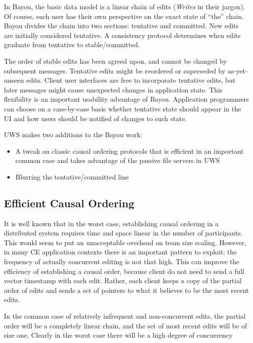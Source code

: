 \documentclass[runningheads]{llncs}
\begin{document}
In Bayou, the basic data model is a linear chain of edits (\emph{Writes} in their jargon).
Of course, each user has their own perspective on the exact state of ``the'' chain.
Bayou divides the chain into two sections: tentative and committed.
New edits are initially considered tentative.
A consistency protocol determines when edits graduate from tentative to stable{\slash}committed.

The order of stable edits has been agreed upon, and cannot be changed by subsequent messages.
Tentative edits might be reordered or superseded by as-yet-unseen edits.
Client user interfaces are free to incorporate tentative edits, but later messages might cause unexpected changes in application state.
This flexibility is an important usability advantage of Bayou.
Application programmers can choose on a case-by-case basis whether tentative state should appear in the UI and how users should be notified of changes to such state.

UWS makes two additions to the Bayou work:

\begin{itemize}
\item A tweak on classic causal ordering protocols that is efficient in an important common case and takes advantage of the passive file servers in UWS
\item Blurring the tentative{\slash}committed line
\end{itemize}

\subsection{Efficient Causal Ordering}

It is well known that in the worst case, establishing causal ordering in a distributed system requires time and space linear in the number of participants.
This would seem to put an unacceptable overhead on team size scaling.
However, in many CE application contexts there is an important pattern to exploit: the frequency of actually concurrent editing is not that high.
This can improve the efficiency of establishing a causal order, because client do not need to send a full vector timestamp with each edit.
Rather, each client keeps a copy of the partial order of edits and sends a set of pointers to what it believes to be the most recent edits.

In the common case of relatively infrequent and non-concurrent edits, the partial order will be a completely linear chain, and the set of most recent edits will be of size one.
Clearly in the worst case there will be a high degree of concurrency
\end{document}
